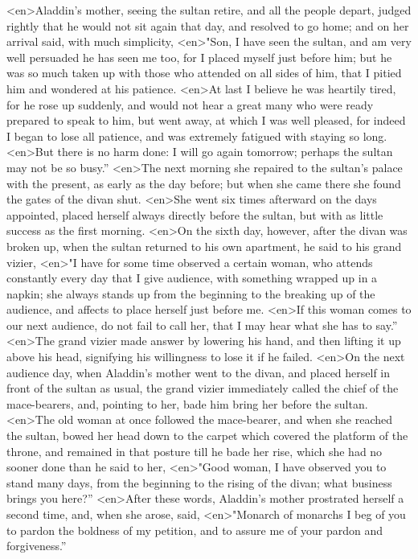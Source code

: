 <en>Aladdin’s mother, seeing the sultan retire, and all the people depart, judged rightly that he would not sit again that day, and resolved to go home; and on her arrival said, with much simplicity,
<en>"Son, I have seen the sultan, and am very well persuaded he has seen me too, for I placed myself just before him; but he was so much taken up with those who attended on all sides of him, that I pitied him and wondered at his patience.
<en>At last I believe he was heartily tired, for he rose up suddenly, and would not hear a great many who were ready prepared to speak to him, but went away, at which I was well pleased, for indeed I began to lose all patience, and was extremely fatigued with staying so long.
<en>But there is no harm done: I will go again tomorrow; perhaps the sultan may not be so busy.”
<en>The next morning she repaired to the sultan’s palace with the present, as early as the day before; but when she came there she found the gates of the divan shut.
<en>She went six times afterward on the days appointed, placed herself always directly before the sultan, but with as little success as the first morning.
<en>On the sixth day, however, after the divan was broken up, when the sultan returned to his own apartment, he said to his grand vizier,
<en>"I have for some time observed a certain woman, who attends constantly every day that I give audience, with something wrapped up in a napkin; she always stands up from the beginning to the breaking up of the audience, and affects to place herself just before me.
<en>If this woman comes to our next audience, do not fail to call her, that I may hear what she has to say.”
<en>The grand vizier made answer by lowering his hand, and then lifting it up above his head, signifying his willingness to lose it if he failed.
<en>On the next audience day, when Aladdin’s mother went to the divan, and placed herself in front of the sultan as usual, the grand vizier immediately called the chief of the mace-bearers, and, pointing to her, bade him bring her before the sultan.
<en>The old woman at once followed the mace-bearer, and when she reached the sultan, bowed her head down to the carpet which covered the platform of the throne, and remained in that posture till he bade her rise, which she had no sooner done than he said to her,
<en>"Good woman, I have observed you to stand many days, from the beginning to the rising of the divan; what business brings you here?”
<en>After these words, Aladdin’s mother prostrated herself a second time, and, when she arose, said,
<en>"Monarch of monarchs I beg of you to pardon the boldness of my petition, and to assure me of your pardon and forgiveness.”
